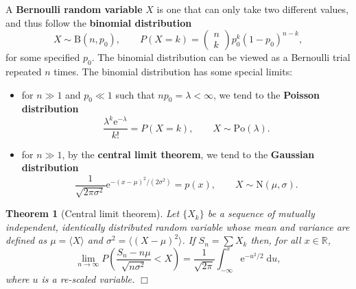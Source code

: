 \documentclass[letter-paper]{tufte-book}
\newtheorem{theorem}{\color{pastel-blue}Theorem}[section]
\newcommand\Def[1]{\textbf{#1}}
\newcommand{\qedwhite}{\hfill \ensuremath{\Box}}
\begin{document}
A \Def{Bernoulli random variable} $X$ is one that can only take two different
values, and thus follow the \Def{binomial distribution}
\begin{equation}
  X\sim \mbox{B}(n, p_0), \qquad P(X = k) = \begin{pmatrix}n \\ k\end{pmatrix} p_0^k (1 - p_0)^{n-k},
\end{equation}
for some specified $p_0$. The binomial distribution can be viewed as a Bernoulli
trial repeated $n$ times. The binomial distribution has some special limits:
\begin{itemize}
  \item for $n\gg 1$ and $p_0 \ll 1$ such that $n p_0 = \lambda < \infty$, we
  tend to the \Def{Poisson distribution}
  \begin{equation}
    \frac{\lambda^k \mathrm{e}^{-\lambda}}{k!} = P(X = k), \qquad X \sim \mbox{Po}(\lambda).
  \end{equation}
  
  \item for $n\gg 1$, by the \Def{central limit theorem}, we tend to the
  \Def{Gaussian distribution} 
  \begin{equation}
    \frac{1}{\sqrt{2\pi\sigma^2}}\mathrm{e}^{-(x - \mu)^2 / (2\sigma^2)} = p(x), \qquad X \sim \mbox{N}(\mu, \sigma).
  \end{equation}
\end{itemize}

\begin{theorem}[Central limit theorem]
Let $\{X_k\}$ be a sequence of mutually independent, identically distributed
random variable whose mean and variance are defined as $\mu = \langle X \rangle$
and $\sigma^2 = \langle (X - \mu)^2 \rangle$. If $S_n = \sum X_k$ then, for all
$x \in \mathbb{R}$,
\begin{equation*}
  \lim_{n\to\infty} P\left(\frac{S_n - n\mu}{\sqrt{n\sigma^2}} < X\right) = \frac{1}{\sqrt{2\pi}}\int_{-\infty}^x \mathrm{e}^{-u^2/2}\; \mathrm{d}u,
\end{equation*}
where $u$ is a re-scaled variable. \qedwhite
\end{theorem}
\end{document}
